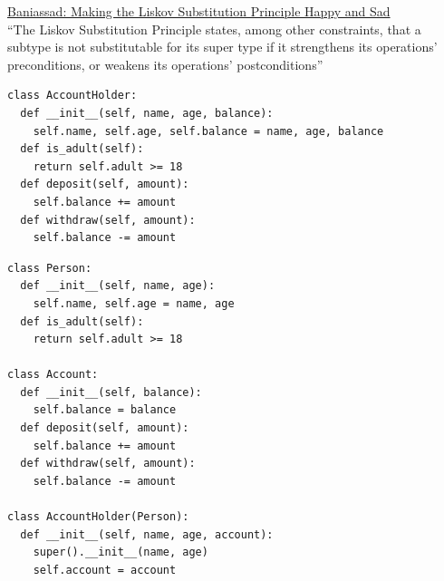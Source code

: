 \documentclass[calcdimensions,landscape,letterpaper]{powersem}
\newcommand{\thecurrentheading}{}
\newcommand{\heading}[1]{\renewcommand{\thecurrentheading}{#1}}
\begin{document}
\begin{slide}
  \heading{Liskov-Substitution - Contracts}
  \begin{center}
    \href{https://www.cs.ubc.ca/~ebani/papers/LiskofHappySad_ICSE-SEET_2018.pdf}{Baniassad: Making the Liskov Substitution Principle Happy and Sad}\\
    ``The Liskov Substitution Principle states, among other constraints, that a subtype is not substitutable for its super type
    if it strengthens its operations' preconditions, or weakens its operations' postconditions''\bigskip\\
  \end{center}
\end{slide}

\begin{slide}
  \heading{Interface Segregation - Before}
  \begin{center}
    \begin{verbatim}
class AccountHolder:
  def __init__(self, name, age, balance):
    self.name, self.age, self.balance = name, age, balance
  def is_adult(self):
    return self.adult >= 18
  def deposit(self, amount):
    self.balance += amount
  def withdraw(self, amount):
    self.balance -= amount
    \end{verbatim}
  \end{center}
\end{slide}

\begin{slide}
  \heading{Interface Segregation - After}
  \begin{center}
    \begin{verbatim}
class Person:
  def __init__(self, name, age):
    self.name, self.age = name, age
  def is_adult(self):
    return self.adult >= 18

class Account:
  def __init__(self, balance):
    self.balance = balance
  def deposit(self, amount):
    self.balance += amount
  def withdraw(self, amount):
    self.balance -= amount

class AccountHolder(Person):
  def __init__(self, name, age, account):
    super().__init__(name, age)
    self.account = account
    \end{verbatim}
  \end{center}
\end{slide}
\end{document}
